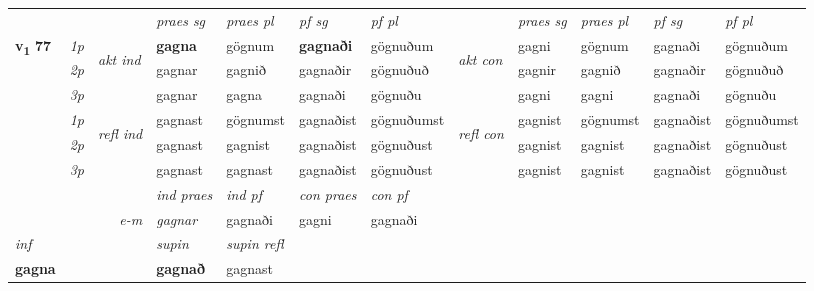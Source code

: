 \begin{longtable}[l]{X>{\footnotesize\itshape}llXXXXlXXXX}
 & &   & \textit{praes sg}  & \textit{praes pl}    & \textit{ pf sg} & \textit{pf pl} & & \textit{praes sg}  & \textit{praes pl}    & \textit{pf sg} & \textit{pf pl }  \\ \cmidrule{4-7} \cmidrule{9-12}
 \multirow{2}{*}{{{\textbf{v{\textsubscript{1}}} \Large{\textbf{77}}}}}  & 1p & \multirow{3}{*}{\begin{turn}{90}\textit{akt ind}\end{turn}} & \textbf{gagna} & gögnum & \textbf{gagnaði} & gögnuðum & \multirow{3}{*}{\begin{turn}{90}\textit{akt con}\end{turn}} &gagni & gögnum & gagnaði & gögnuðum\\*
 & 2p &  &  gagnar  & gagnið & gagnaðir & gögnuðuð & & gagnir & gagnið & gagnaðir & gögnuðuð \\*
 & 3p &  & gagnar & gagna & gagnaði & gögnuðu & & gagni & gagni& gagnaði & gögnuðu \\*
\cmidrule{4-7} \cmidrule{9-12}
 & 1p & \multirow{3}{*}{\begin{turn}{90}\textit{refl ind}\end{turn}}  & gagnast & gögnumst & gagnaðist & gögnuðumst & \multirow{3}{*}{\begin{turn}{90}\textit{refl con}\end{turn}}  &gagnist & gögnumst & gagnaðist & gögnuðumst \\*
 & 2p &  & gagnast & gagnist & gagnaðist & gögnuðust & &gagnist & gagnist & gagnaðist & gögnuðust \\*
 & 3p  & & gagnast & gagnast & gagnaðist & gögnuðust & & gagnist & gagnist& gagnaðist & gögnuðust \\*
\cmidrule{4-7} \cmidrule{9-12}

   && &  \textit{ind praes} & \textit{ind pf} & \textit{con praes} & \textit{con pf} \\*
\multicolumn{3}{r}{\textit{e-m}} & gagnar & gagnaði & gagni & gagnaði \\*

\cmidrule{4-7}
   {\textit{inf}} & &      & \textit{supin} & \textit{supin refl}  \\*
  {\textbf{gagna}} & &      &  \textbf{gagnað} & gagnast  \\*

\midrule


\end{longtable}
